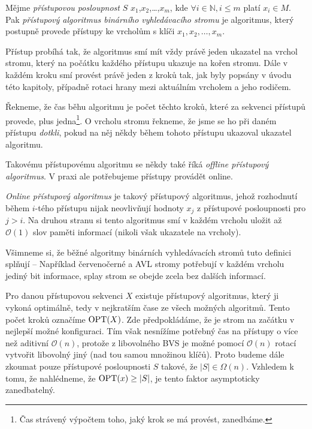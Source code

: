 \begin{definice}
Mějme \emph{přístupovou posloupnost} $S$ $x_1$,$x_2$,\dots,$x_m$, kde $\forall i \in
\mathbb N, i\leq m$ platí $x_i\in M$. Pak \emph{přístupový algoritmus
binárního vyhledávacího stromu} je algoritmus, který postupně provede přístupy
ke vrcholům s klíči $x_1, x_2,\dots,x_m$.

Přístup probíhá tak, že algoritmus smí mít vždy právě jeden ukazatel na vrchol
stromu, který na počátku každého přístupu ukazuje na kořen stromu. Dále v
každém kroku smí provést právě jeden z kroků tak, jak byly popsány v úvodu této kapitoly, případně rotaci hrany mezi aktuálním vrcholem a jeho rodičem. 

Řekneme, že čas běhu algoritmu je počet těchto kroků, které za sekvenci
přístupů provede, plus jedna\footnote{Čas strávený výpočtem toho, jaký krok se má provést, zanedbáme.}. O vrcholu stromu řekneme, že jsme se ho při daném
přístupu \emph{dotkli}, pokud na něj někdy během tohoto přístupu ukazoval
ukazatel algoritmu.  \end{definice}

Takovému přístupovému algoritmu se někdy také říká \emph{offline přístupový
algoritmus}. V praxi ale potřebujeme přístupy provádět online.

\begin{definice}
\emph{Online přístupový algoritmus} je takový přístupový algoritmus, jehož
rozhodnutí během $i$-tého přístupu nijak neovlivňují hodnoty $x_j$ z přístupové
posloupnosti pro $j>i$. Na druhou stranu si tento algoritmus smí v každém
vrcholu uložit až $\mathcal O(1)$ slov paměti informací (nikoli však ukazatele
na vrcholy).
\end{definice}

Všimneme si, že běžné algoritmy binárních vyhledávacích stromů tuto definici
splňují -- Například červenočerné a AVL stromy potřebují v každém vrcholu
jediný bit informace, splay strom se obejde zcela bez dalších informací.

Pro danou přístupovou sekvenci $X$ existuje přístupový algoritmus, který ji
vykoná optimálně, tedy v nejkratším čase ze všech možných algoritmů. Tento
počet kroků označíme $\operatorname{OPT}(X)$. Zde předpokládáme, že je strom na začátku v
nejlepší možné konfiguraci. Tím však nesnížíme potřebný čas na přístupy o více
než aditivní $\mathcal O(n)$, protože z libovolného BVS je možné pomocí
$\mathcal O(n)$ rotací vytvořit libovolný jiný (nad tou samou množinou klíčů).
Proto budeme dále zkoumat pouze přístupové posloupnosti $S$ takové, že $|S| \in
\Omega(n)$. Vzhledem k tomu, že nahlédneme, že $\operatorname{OPT}(x)\geq |S|$, je tento
faktor asymptoticky zanedbatelný. 


